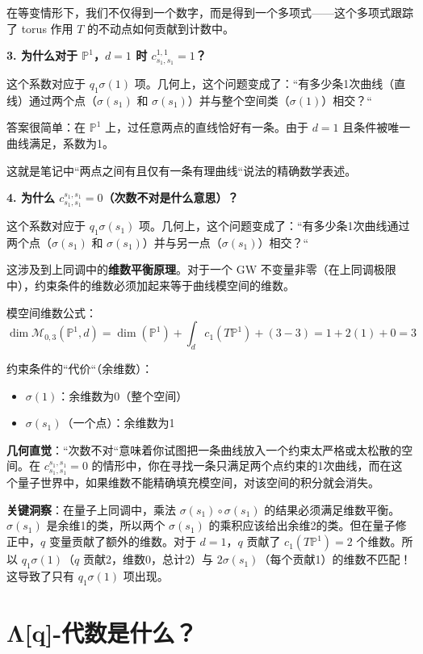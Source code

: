 在等变情形下，我们不仅得到一个数字，而是得到一个多项式——这个多项式跟踪了 torus 作用 $T$ 的不动点如何贡献到计数中。

\textbf{3. 为什么对于 $\mathbb{P}^1$，$d=1$ 时 $c_{s_1,s_1}^{1,1} = 1$？}

这个系数对应于 $q_1 \sigma(1)$ 项。几何上，这个问题变成了：``有多少条1次曲线（直线）通过两个点（$\sigma(s_1)$ 和 $\sigma(s_1)$）并与整个空间类（$\sigma(1)$）相交？``

答案很简单：在 $\mathbb{P}^1$ 上，过任意两点的直线恰好有一条。由于 $d=1$ 且条件被唯一曲线满足，系数为1。

这就是笔记中``两点之间有且仅有一条有理曲线``说法的精确数学表述。

\textbf{4. 为什么 $c_{s_1,s_1}^{s_1,s_1} = 0$（次数不对是什么意思）？}

这个系数对应于 $q_1 \sigma(s_1)$ 项。几何上，这个问题变成了：``有多少条1次曲线通过两个点（$\sigma(s_1)$ 和 $\sigma(s_1)$）并与另一点（$\sigma(s_1)$）相交？``

这涉及到上同调中的\textbf{维数平衡原理}。对于一个 GW 不变量非零（在上同调极限中），约束条件的维数必须加起来等于曲线模空间的维数。

模空间维数公式：
$$\dim \mathcal{M}_{0,3}(\mathbb{P}^1, d) = \dim(\mathbb{P}^1) + \int_d c_1(T\mathbb{P}^1) + (3 - 3) = 1 + 2(1) + 0 = 3$$

约束条件的``代价``（余维数）：
\begin{itemize}
\item $\sigma(1)$：余维数为0（整个空间）
\item $\sigma(s_1)$（一个点）：余维数为1
\end{itemize}

\textbf{几何直觉}：``次数不对``意味着你试图把一条曲线放入一个约束太严格或太松散的空间。在 $c_{s_1,s_1}^{s_1,s_1} = 0$ 的情形中，你在寻找一条只满足两个点约束的1次曲线，而在这个量子世界中，如果维数不能精确填充模空间，对该空间的积分就会消失。

\textbf{关键洞察}：在量子上同调中，乘法 $\sigma(s_1) \circ \sigma(s_1)$ 的结果必须满足维数平衡。$\sigma(s_1)$ 是余维1的类，所以两个 $\sigma(s_1)$ 的乘积应该给出余维2的类。但在量子修正中，$q$ 变量贡献了额外的维数。对于 $d=1$，$q$ 贡献了 $c_1(T\mathbb{P}^1) = 2$ 个维数。所以 $q_1 \sigma(1)$（$q$ 贡献2，维数0，总计2）与 $2\sigma(s_1)$（每个贡献1）的维数不匹配！这导致了只有 $q_1 \sigma(1)$ 项出现。
\section{Λ[q]-代数是什么？}\label{sec:qa-Lambda-q-algebra}
